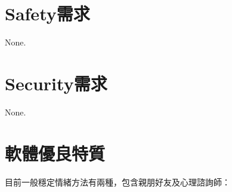 \documentclass[12pt]{scrreprt}
\begin{document}
%

\section{Safety需求}None.

\section{Security需求}None.

\section{軟體優良特質}
目前一般穩定情緒方法有兩種，包含親朋好友及心理諮詢師：
\end{document}
